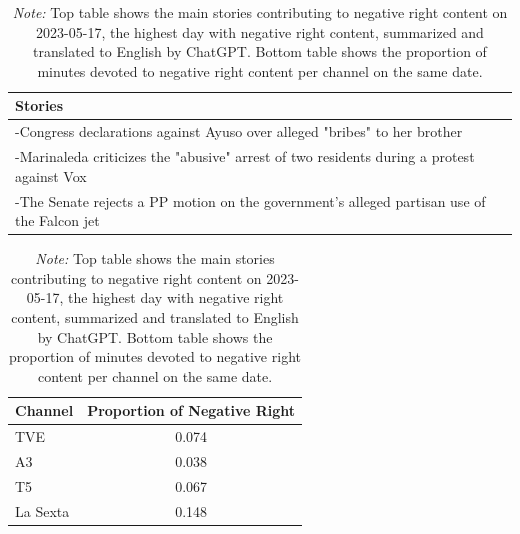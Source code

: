 \documentclass[12pt]{article}
\begin{document}
	
		\begin{table}[!htb]
								\caption{Top Stories for Negative Right and Outlet's Production}
		\centering
		\begin{tabular}{p{}}
			\toprule
			\textbf{Stories}  \\
			\midrule
			-Congress declarations against Ayuso over alleged "bribes" to her brother  \\
			-Marinaleda criticizes the "abusive" arrest of two residents during a protest against Vox  \\
			-The Senate rejects a PP motion on the government's alleged partisan use of the Falcon jet  \\
			\bottomrule
		\end{tabular}
		\begin{tabular}{l c}
			\toprule
			\textbf{Channel} & \textbf{Proportion of Negative Right} \\
			\midrule
			TVE & 0.074 \\
			A3  & 0.038 \\
			T5 & 0.067 \\
			La Sexta  & 0.148 \\
			\bottomrule
		\end{tabular}

		
			\caption*{\small  \textit{Note:} Top table shows the main stories contributing to negative right content on 2023-05-17, the highest day with negative right content,  summarized and translated to English by ChatGPT. Bottom table shows the proportion of minutes devoted to negative right content per channel on the same date. }

		\label{tab:neg_right_channels}
	\end{table}
	
\end{document}
